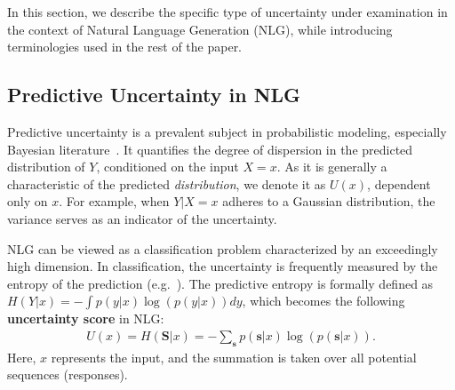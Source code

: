 
In this section, we describe the specific type of uncertainty under examination in the context of Natural Language Generation (NLG), while introducing terminologies  used in the rest of the paper. 

\subsection{Predictive Uncertainty in NLG}\label{sec:background:u}
Predictive uncertainty is a prevalent subject in probabilistic modeling, especially Bayesian literature~\citep{NEURIPS2018_3ea2db50,mcdp}.
It quantifies the degree of dispersion in the predicted distribution of $Y$, conditioned on the input $X=x$. 
As it is generally a characteristic of the predicted \textit{distribution}, we denote it as $U(x)$, dependent only on $x$. 
For example, when $Y|X=x$ adheres to a Gaussian distribution, the variance serves as an indicator of the uncertainty.

NLG can be viewed as a classification problem characterized by an exceedingly high dimension. 
In classification, the uncertainty is frequently measured by the entropy of the prediction (e.g.~\cite{abdar2021review,kuhn2023semantic,sun2019feature,wellmann2012uncertainties}). 
The predictive entropy is formally defined as $H(Y|x) = -\int p(y|x) \log{(p(y|x))} dy$, which becomes the following {\bf uncertainty score} in NLG:
{%
\begin{align}
    U(x) = H(\mathbf{S}|x) = 
    -\sum_{\mathbf{s}} p(\mathbf{s}|x) \log{(p(\mathbf{s}|x))}. \label{eq:entropy:nlg}
\end{align}
}Here, $x$ represents the input, 
and the summation is taken over all potential sequences (responses). 


